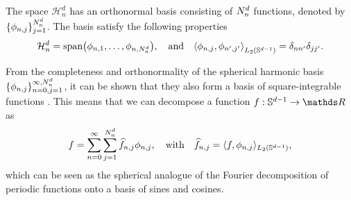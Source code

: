 The space $\mathcal{H}_{n}^d$ has an orthonormal basis consisting of $N^d_n$ functions, denoted by $\{\phi_{n,j}\}_{j=1}^{N^d_n}$. The basis satisfy the following properties
\begin{equation}
    \mathcal{H}_{n}^d  = \textrm{span}\left(\phi_{n,1}, \ldots, \phi_{n, \dnumharmonicsforlevel}\right),\quad\text{and}\quad\left\langle \phi_{n, j}, \phi_{n', j'}\right\rangle_{L_2(\dsphere)} = \delta_{n n'} \delta_{j j'}.
\end{equation}

From the completeness and orthonormality of the spherical harmonic basis $\{\phi_{n,j}\}_{n=0,j=1}^{\infty,N^d_n}$, it can be shown that they also form a basis of square-integrable functions \citep{frye2014}. This means that we can decompose a function $f: \dsphere \rightarrow \Reals$ as
\begin{equation}
    f = \sum_{n=0}^{\infty} \sum_{j=1}^{N^d_n} \widehat{f}_{n, j} \phi_{n, j},\quad\text{with}\quad\widehat{f}_{n, j} = \langle f, \phi_{n, j} \rangle_{L_2(\mathbb{S}^{d-1})},
\end{equation}
which can be seen as the spherical analogue of the Fourier decomposition of periodic functions onto a basis of sines and cosines.

